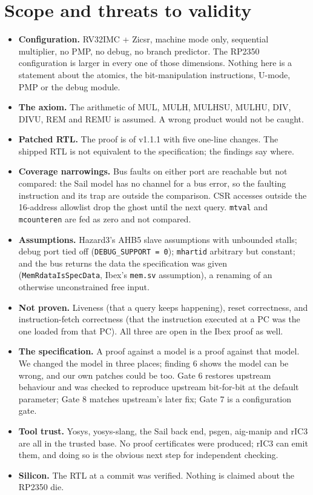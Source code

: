 \documentclass[11pt]{article}
\newcommand{\code}[1]{\texttt{#1}}
\begin{document}
\section{Scope and threats to validity}
\label{sec:scope}

\begin{itemize}
\item \textbf{Configuration.} RV32IMC + Zicsr, machine mode only, sequential
  multiplier, no PMP, no debug, no branch predictor. The RP2350 configuration
  is larger in every one of those dimensions. Nothing here is a statement
  about the atomics, the bit-manipulation instructions, U-mode, PMP or the
  debug module.
\item \textbf{The axiom.} The arithmetic of MUL, MULH, MULHSU, MULHU, DIV, DIVU,
  REM and REMU is assumed. A wrong product would not be caught.
\item \textbf{Patched RTL.} The proof is of v1.1.1 with five one-line changes.
  The shipped RTL is not equivalent to the specification; the findings say
  where.
\item \textbf{Coverage narrowings.} Bus faults on either port are reachable
  but not compared: the Sail model has no channel for a bus error, so the
  faulting instruction and its trap are outside the comparison. CSR accesses
  outside the 16-address allowlist drop the ghost until the next query.
  \code{mtval} and \code{mcounteren} are fed as zero and not compared.
\item \textbf{Assumptions.} Hazard3's AHB5 slave assumptions with unbounded
  stalls; debug port tied off (\code{DEBUG\_SUPPORT = 0}); \code{mhartid}
  arbitrary but constant; and the bus returns the data the specification was
  given (\code{MemRdataIsSpecData}, Ibex's \code{mem.sv} assumption), a
  renaming of an otherwise unconstrained free input.
\item \textbf{Not proven.} Liveness (that a query keeps happening), reset
  correctness, and instruction-fetch correctness (that the instruction
  executed at a PC was the one loaded from that PC). All three are open in the
  Ibex proof as well.
\item \textbf{The specification.} A proof against a model is a proof against
  that model. We changed the model in three places; finding 6 shows the model
  can be wrong, and our own patches could be too. Gate 6 restores upstream
  behaviour and was checked to reproduce upstream bit-for-bit at the default
  parameter; Gate 8 matches upstream's later fix; Gate 7 is a configuration
  gate.
\item \textbf{Tool trust.} Yosys, yosys-slang, the Sail back end, psgen,
  aig-manip and rIC3 are all in the trusted base. No proof certificates were
  produced; rIC3 can emit them, and doing so is the obvious next step for
  independent checking.
\item \textbf{Silicon.} The RTL at a commit was verified. Nothing is claimed
  about the RP2350 die.
\end{itemize}
\end{document}
